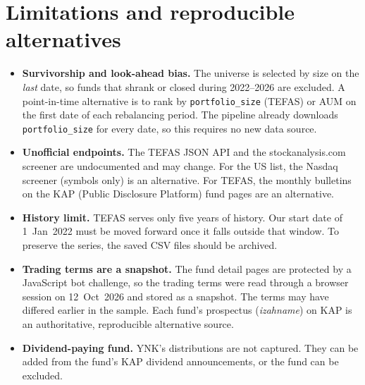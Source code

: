 \documentclass[11pt,a4paper]{article}
\newcommand{\code}[1]{\texttt{\small #1}}
\begin{document}
\section{Limitations and reproducible alternatives}\label{sec:limits}
\begin{itemize}
  \item \textbf{Survivorship and look-ahead bias.} The universe is selected by size on the
        \emph{last} date, so funds that shrank or closed during 2022--2026 are excluded.
        A point-in-time alternative is to rank by \code{portfolio\_size} (TEFAS) or AUM on
        the first date of each rebalancing period. The pipeline already downloads
        \code{portfolio\_size} for every date, so this requires no new data source.
  \item \textbf{Unofficial endpoints.} The TEFAS JSON API and the stockanalysis.com
        screener are undocumented and may change. For the US list, the Nasdaq screener
        (symbols only) is an alternative. For TEFAS, the monthly bulletins on the KAP
        (Public Disclosure Platform) fund pages are an alternative.
  \item \textbf{History limit.} TEFAS serves only five years of history. Our start date
        of 1~Jan~2022 must be moved forward once it falls outside that window. To preserve
        the series, the saved CSV files should be archived.
  \item \textbf{Trading terms are a snapshot.} The fund detail pages are protected by a
        JavaScript bot challenge, so the trading terms were read through a browser session
        on 12~Oct~2026 and stored as a snapshot. The terms may have differed earlier in the
        sample. Each fund's prospectus (\emph{izahname}) on KAP is an authoritative,
        reproducible alternative source.
  \item \textbf{Dividend-paying fund.} YNK's distributions are not captured. They can be
        added from the fund's KAP dividend announcements, or the fund can be excluded.
\end{itemize}
\end{document}
